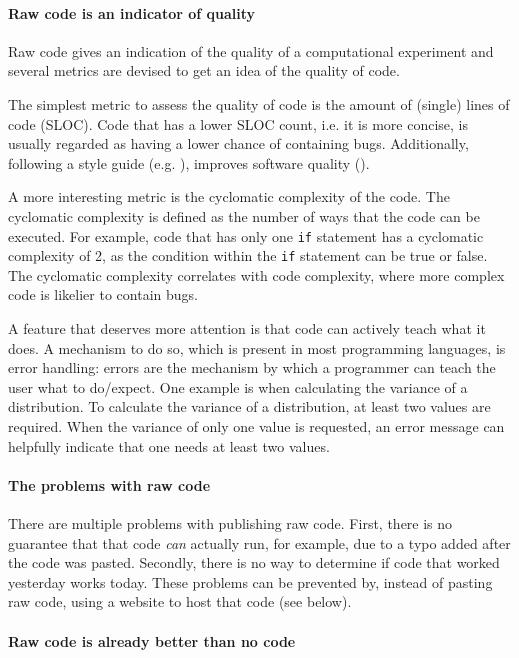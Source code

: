 \paragraph{Raw code is an indicator of quality}

Raw code gives an indication of the quality 
of a computational experiment and several metrics are
devised to get an idea of the quality of code.

The simplest metric to assess the quality of code is 
the amount of (single) lines of code (SLOC). 
Code that has a lower SLOC count, i.e. it is more concise,
is usually regarded as having a lower chance of containing bugs.
Additionally, following a style guide (e.g. \cite{style_guide}), 
improves software quality (\cite{fang2001}).

A more interesting metric is the cyclomatic complexity of the code.
The cyclomatic complexity is defined as the number of ways that
the code can be executed. 
For example, code that has only one \verb|if| statement
has a cyclomatic complexity of 2, as the condition within the \verb|if|
statement can be true or false.
The cyclomatic complexity correlates with code complexity,
where more complex code is likelier to contain bugs.

A feature that deserves more attention
is that code can actively teach what it does.
A mechanism to do so, which is present in most programming
languages, is error handling: errors are the mechanism
by which a programmer can teach the user what to do/expect.
One example is when calculating the variance of a distribution.
To calculate the variance of a distribution, at least two values
are required. When the variance of only one value is requested,
an error message can helpfully indicate that one needs at least two values.

\paragraph{The problems with raw code}

There are multiple problems with publishing raw code.
First, there is no guarantee that that code \emph{can} actually
run, for example, due to a typo added after the code was pasted.
Secondly, there is no way to determine if code that worked yesterday
works today. These problems can be prevented by, instead of
pasting raw code, using a website to host that code (see below).

\paragraph{Raw code is already better than no code}

